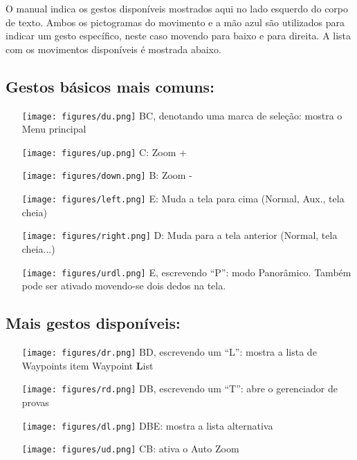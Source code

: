 O manual indica os gestos disponíveis mostrados aqui no lado esquerdo do corpo de texto.  Ambos os pictogramas do movimento e a mão azul são utilizados para indicar um gesto específico, neste caso movendo para baixo e para direita.  A lista com os movimentos disponíveis é mostrada abaixo. 
\vspace{2em}

\subsection*{Gestos básicos mais comuns:}
\begin{itemize}
\item[\raisebox{-1em}
{\texttt{[image: figures/du.png]}}] BC, denotando uma marca de seleção: mostra o Menu principal
\item[\raisebox{-1em}
{\texttt{[image: figures/up.png]}}] C: Zoom +
\item[\raisebox{-1em}
{\texttt{[image: figures/down.png]}}] B: Zoom -
\item[\raisebox{-1em}
{\texttt{[image: figures/left.png]}}] E: Muda a tela para cima (Normal, Aux., tela cheia)
\item[\raisebox{-1em}
{\texttt{[image: figures/right.png]}}] D: Muda para a tela anterior (Normal, tela cheia...)
\item[\raisebox{-1em}
{\texttt{[image: figures/urdl.png]}}] E, escrevendo “P”: modo Panorâmico.  Também pode ser ativado movendo-se dois dedos na tela.
\end{itemize}
\vspace{2em}

\subsection*{Mais gestos disponíveis:}
\begin{itemize}
\item[\raisebox{-1em}
{\texttt{[image: figures/dr.png]}}] BD, escrevendo um “L”: mostra a lista de Waypoints 
item Waypoint \textbf{L}ist
\item[\raisebox{-1em}
{\texttt{[image: figures/rd.png]}}] DB, escrevendo um “T”: abre o gerenciador de provas
\item[\raisebox{-1em}
{\texttt{[image: figures/dl.png]}}] DBE: mostra a lista alternativa
\item[\raisebox{-1em}
{\texttt{[image: figures/ud.png]}}]CB: ativa o Auto Zoom
\end{itemize}
\vspace{2em}


